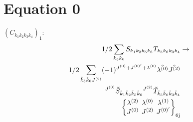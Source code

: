 \documentclass[11pt]{article}
\newcommand{\sixj}[6]{\begingroup\setlength{\arraycolsep}{0.2em}\begin{Bmatrix} #1 & #2 & #3 \\ #4 & #5 & #6 \end{Bmatrix}_{\text{6j}}\endgroup}
\begin{document}
\section{Equation 0}
$\left({C}_{{k}_{1}{k}_{2}{k}_{3}{k}_{4}}\right)_{1}$:
\begin{align}
1/2\sum_{{k}_{5}{k}_{6}}{S}_{{k}_{1}{k}_{2}{k}_{5}{k}_{6}}{T}_{{k}_{5}{k}_{6}{k}_{3}{k}_{4}}&\rightarrow \notag \\1/2\sum_{\tilde{k}_{5}\tilde{k}_{6}J^{(2)}}(-1)^{J^{(0)} +J^{(0)'} +\lambda^{(0)} }\hat{\lambda^{(0)}}\hat{J^{(2)}}& \notag \\{}^{J^{(0)}}\tilde{S}_{\tilde{k}_{1}\tilde{k}_{2}\tilde{k}_{5}\tilde{k}_{6}}{}^{J^{(2)}}\tilde{T}_{\tilde{k}_{5}\tilde{k}_{6}\tilde{k}_{3}\tilde{k}_{4}}& \notag \\\sixj{\lambda^{(2)}}{\lambda^{(0)}}{\lambda^{(1)}}{J^{(0)}}{J^{(2)}}{J^{(0)'}}
\end{align}
\end{document}
